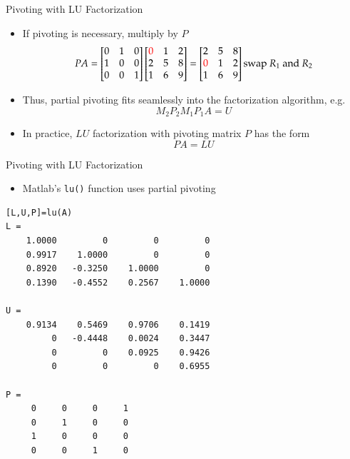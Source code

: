 \documentclass[10pt]{beamer}
\begin{document}
\begin{frame}{Pivoting with LU Factorization}
\begin{itemize}
    \item If pivoting is necessary, multiply by $P$
    $$PA = 
    \begin{bmatrix}
    0 & 1 & 0\\
    1 & 0 & 0\\
    0 & 0 & 1\\
    \end{bmatrix}
\begin{bmatrix}
\textcolor{red}{0} & 1 & 2\\
2 & 5 & 8\\
1 & 6 & 9\\
\end{bmatrix} =
\begin{bmatrix}
2 & 5 & 8\\
\textcolor{red}{0} & 1 & 2\\
1 & 6 & 9\\
\end{bmatrix} \text{swap $R_1$ and $R_2$}
    $$

    \item Thus, partial pivoting fits seamlessly into the factorization algorithm, e.g.
    $$
        M_2 P_2 M_1 P_1 A = U
    $$
    
    \item In practice, $LU$ factorization with pivoting matrix $P$ has the form
            \[ PA = L U\]

\end{itemize}
\end{frame}
\begin{frame}{Pivoting with LU Factorization}
\begin{itemize}
    \item Matlab's \texttt{lu()} function uses partial pivoting
\end{itemize}
\begin{lstlisting}
[L,U,P]=lu(A)
L =
    1.0000         0         0         0
    0.9917    1.0000         0         0
    0.8920   -0.3250    1.0000         0
    0.1390   -0.4552    0.2567    1.0000

U =
    0.9134    0.5469    0.9706    0.1419
         0   -0.4448    0.0024    0.3447
         0         0    0.0925    0.9426
         0         0         0    0.6955

P =
     0     0     0     1
     0     1     0     0
     1     0     0     0
     0     0     1     0
\end{lstlisting}
\end{frame}
\end{document}
